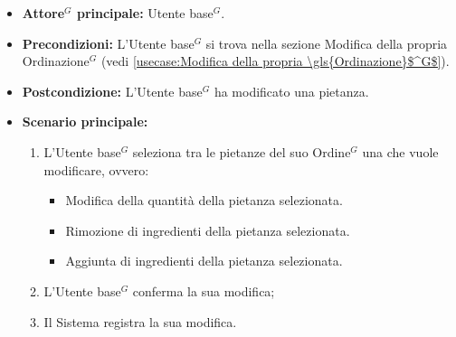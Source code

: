 \label{usecase:Modifica pietanza}
\begin{itemize}
	\item \textbf{\gls{Attore}$^G$ principale:} \gls{Utente base}$^G$.

	\item \textbf{Precondizioni:}  L'\gls{Utente base}$^G$ si trova nella sezione Modifica della propria \gls{Ordinazione}$^G$ (vedi \autoref{usecase:Modifica della propria \gls{Ordinazione}$^G$}).


	\item \textbf{Postcondizione:} L'\gls{Utente base}$^G$ ha modificato una pietanza.

	\item \textbf{Scenario principale:}
	      \begin{enumerate}
		      \item L'\gls{Utente base}$^G$ seleziona tra le pietanze del suo \gls{Ordine}$^G$ una che vuole modificare, ovvero:
		            \begin{itemize}
			            \item Modifica della quantità della pietanza selezionata.
			            \item Rimozione di ingredienti della pietanza selezionata.
			            \item Aggiunta di ingredienti della pietanza selezionata.
		            \end{itemize}
		      \item L'\gls{Utente base}$^G$ conferma la sua modifica;
		      \item Il Sistema registra la sua modifica.
	      \end{enumerate}
\end{itemize}
